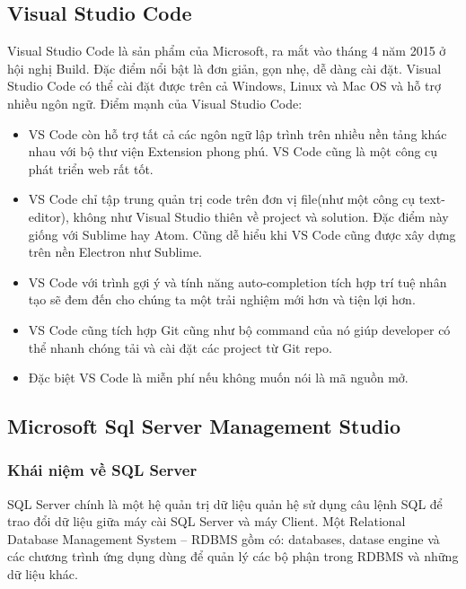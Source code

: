 \subsection{Visual Studio Code}
Visual Studio Code là sản phẩm của Microsoft, ra mắt vào tháng 4 năm 2015 ở hội nghị Build. Đặc điểm nổi bật là đơn giản, gọn nhẹ, dễ dàng cài đặt. Visual Studio Code có thể cài đặt được trên cả Windows, Linux và Mac OS và hỗ trợ nhiều ngôn ngữ. Điểm mạnh của Visual Studio Code:
\begin{itemize}
	\item VS Code còn hỗ trợ tất cả các ngôn ngữ lập trình trên nhiều nền tảng khác nhau với bộ thư viện Extension phong phú. VS Code cũng là một công cụ phát triển web rất tốt.
	\item VS Code chỉ tập trung quản trị code trên đơn vị file(như một công cụ text-editor), không như Visual Studio thiên về project và solution. Đặc điểm này giống với Sublime hay Atom. Cũng dễ hiểu khi VS Code cũng được xây dựng trên nền Electron như Sublime.
	\item VS Code với trình gợi ý và tính năng auto-completion tích hợp trí tuệ nhân tạo sẽ đem đến cho chúng ta một trải nghiệm mới hơn và tiện lợi hơn.
	\item VS Code cũng tích hợp Git cũng như bộ command của nó giúp developer có thể nhanh chóng tải và cài đặt các project từ Git repo.
	\item Đặc biệt VS Code là miễn phí nếu không muốn nói là mã nguồn mở.
\end{itemize}
\subsection{Microsoft Sql Server Management Studio}
\subsubsection{Khái niệm về SQL Server}
SQL Server chính là một hệ quản trị dữ liệu quản hệ sử dụng câu lệnh SQL để trao đổi dữ liệu giữa máy cài SQL Server và máy Client. Một Relational Database Management System – RDBMS gồm có: databases, datase engine và các chương trình ứng dụng dùng để quản lý các bộ phận trong RDBMS và những dữ liệu khác.
